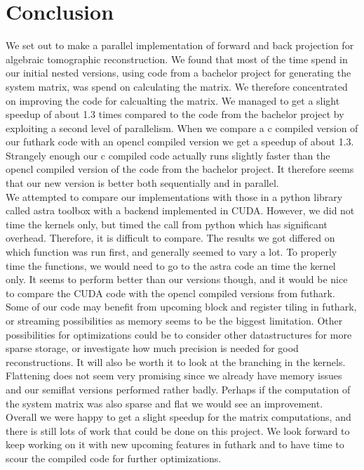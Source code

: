 \section{Conclusion}
We set out to make a parallel implementation of forward and back projection for algebraic tomographic reconstruction. We found that most of the time spend in our initial nested versions, using code from a bachelor project for generating the system matrix, was spend on calculating the matrix. We therefore concentrated on improving the code for calcualting the matrix. We managed to get a slight speedup of about 1.3 times compared to the code from the bachelor project by exploiting a second level of parallelism. When we compare a c compiled version of our futhark code with an opencl compiled version we get a speedup of about 1.3. Strangely enough our c compiled code actually runs slightly faster than the opencl compiled version of the code from the bachelor project. It therefore seems that our new version is better both sequentially and in parallel.\\
We attempted to compare our implementations with those in a python library called astra toolbox with a backend implemented in CUDA. However, we did not time the kernels only, but timed the call from python which has significant overhead. Therefore, it is difficult to compare. The results we got differed on which function was run first, and generally seemed to vary a lot. To properly time the functions, we would need to go to the astra code an time the kernel only. It seems to perform better than our versions though, and it would be nice to compare the CUDA code with the opencl compiled versions from futhark.\\
Some of our code may benefit from upcoming block and register tiling in futhark, or streaming possibilities as memory seems to be the biggest limitation. Other possibilities for optimizations could be to consider other datastructures for more sparse storage, or investigate how much precision is needed for good reconstructions. It will also be worth it to look at the branching in the kernels. Flattening does not seem very promising since we already have memory issues and our semiflat versions performed rather badly. Perhaps if the computation of the system matrix was also sparse and flat we would see an improvement. \\
Overall we were happy to get a slight speedup for the matrix computations, and there is still lots of work that could be done on this project. We look forward to keep working on it with new upcoming features in futhark and to have time to scour the compiled code for further optimizations.
